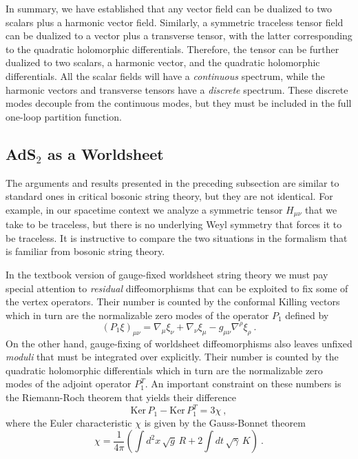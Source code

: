 \documentclass[12pt]{article}
\begin{document}
In summary, we have established that any vector field can be dualized to two scalars plus a harmonic vector field.  Similarly, a symmetric traceless tensor field can be dualized to a vector plus a transverse tensor, with the latter corresponding to the quadratic holomorphic differentials. Therefore, the tensor can be further dualized to two scalars, a harmonic vector, and the quadratic holomorphic differentials.  All the scalar fields will have a {\it continuous} spectrum, while the harmonic vectors and transverse tensors have a \emph{discrete} spectrum.  These discrete modes decouple from the continuous modes, but they must be included in the full one-loop partition function.

\subsection{\texorpdfstring{AdS$_2$}{AdS2} as a Worldsheet}
\label{sec:quant:worldsheet}

The arguments and results presented in the preceding subsection are similar to standard ones in critical bosonic string theory, but they are not identical. For example, in our spacetime context we analyze a symmetric tensor $H_{\mu\nu}$ that we take to be traceless, but there is no underlying Weyl symmetry that forces it to be traceless. It is instructive to compare the two situations in the formalism that is familiar from bosonic string theory.

In the textbook version of gauge-fixed worldsheet string theory we must pay special attention to {\it residual} diffeomorphisms that 
can be exploited to fix some of the vertex operators. Their number is counted by the conformal Killing vectors which in turn are the normalizable 
zero modes of the operator $P_1$ defined by
%
\begin{equation}
	(P_1 \xi)_{\mu\nu} = \nabla_\mu \xi_\nu + \nabla_\nu \xi_\mu - g_{\mu\nu}\nabla^\rho \xi_\rho~.
\end{equation}
%
On the other hand, gauge-fixing of worldsheet diffeomorphisms also leaves unfixed {\it moduli} that must be integrated over explicitly. 
Their number is counted by the quadratic holomorphic differentials which in turn are the normalizable zero modes of the adjoint operator $P_1^T$.  
An important constraint on these numbers is the Riemann-Roch theorem that yields their difference
%
\begin{equation}
	\text{Ker}\,P_1 - \text{Ker}\,P_1^T = 3 \chi~,
\end{equation}
%
where the Euler characteristic $\chi$ is given by the Gauss-Bonnet theorem
%
\begin{equation}
	\chi = \frac{1}{4\pi}\left( \int d^2x\,\sqrt{g}\,R + 2 \int dt\,\sqrt{\gamma}\,K\right)~.
\label{eq:gaussbonnet}
\end{equation}
%
\end{document}
